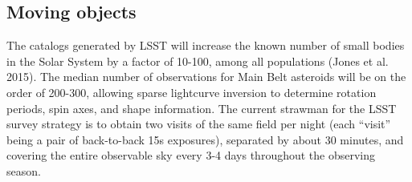 \documentclass{iau}
\begin{document}





\subsection{Moving objects}

The catalogs generated by LSST will increase the known number of small
bodies in the Solar System by a factor of 10-100, among all
populations (Jones et al. 2015). The median number of observations for
Main Belt asteroids will be on the order of 200-300, allowing sparse
lightcurve inversion to determine rotation periods, spin axes, and
shape information. The current strawman for the LSST survey strategy
is to obtain two visits of the same field per night (each ``visit''
being a pair of back-to-back 15s exposures), separated by about 30
minutes, and covering the entire observable sky every 3-4 days
throughout the observing season.
\end{document}

